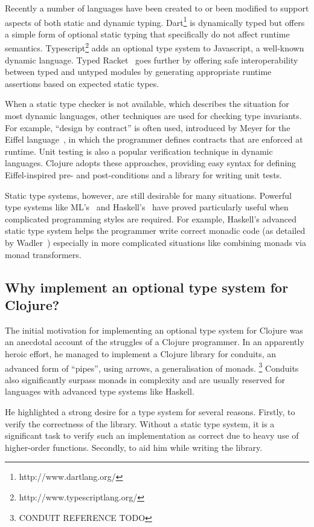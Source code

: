 Recently a number of languages have been created to or been modified to support aspects
of both static and dynamic typing.
Dart\footnote{http://www.dartlang.org/} is dynamically typed but offers a simple form of optional
static typing that specifically do not affect runtime semantics.
Typescript\footnote{http://www.typescriptlang.org/} adds an optional type system to Javascript,
a well-known dynamic language.
Typed Racket~\cite{TF08,Tob10} goes further by offering safe interoperability
between typed and untyped modules by generating appropriate runtime assertions based
on expected static types.

When a static type checker is not available, which describes the situation
for most dynamic languages, other techniques are used for checking
type invariants. For example, ``design by contract'' is often used,
introduced by Meyer for the Eiffel language~\cite{Mey92},
in which the programmer defines contracts that are enforced at runtime.
Unit testing is also a popular verification technique in dynamic languages.
Clojure adopts these approaches, providing easy syntax for defining 
Eiffel-inspired pre- and post-conditions and a library for writing unit tests.

Static type systems, however, are still desirable for many situations.
Powerful type systems like ML's~\cite{Mil97} and Haskell's~\cite{Mar10} have proved particularly useful
when complicated programming styles are required. For example,
Haskell's advanced static type system helps the programmer write correct monadic code
(as detailed by Wadler~\cite{Wad95})
especially in more complicated situations like combining monads via monad transformers.

\subsection{Why implement an optional type system for Clojure?}

The initial motivation for implementing an optional type system
for Clojure was an anecdotal account of the struggles
of a Clojure programmer. In an apparently heroic effort, he managed to 
implement a Clojure library for conduits, an advanced form of ``pipes'',
using arrows, a generalisation of monads.
\footnote{CONDUIT REFERENCE TODO}
Conduits also significantly surpass monads in complexity and are usually reserved
for languages with advanced type systems like Haskell.

He highlighted a strong desire for a type system for several reasons.
Firstly, to verify the correctness of the library.
Without a static type system, it is a significant task
to verify such an implementation as correct due to heavy use
of higher-order functions.
Secondly, to aid him while writing the library.

